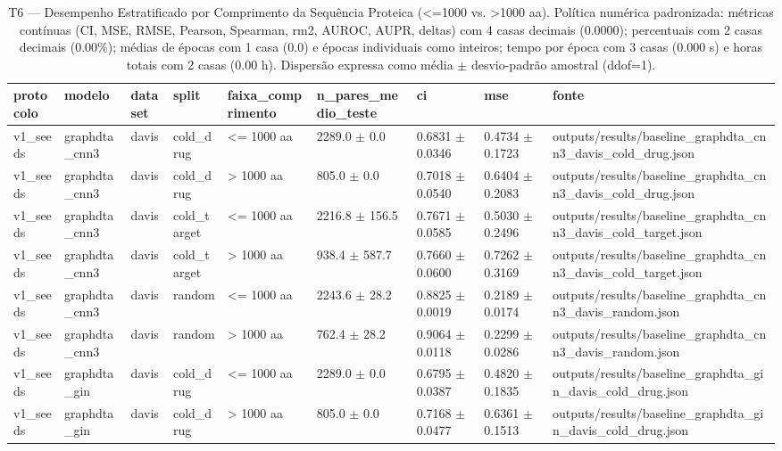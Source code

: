 \begin{table}[htbp]
\centering
\small
\caption{T6 — Desempenho Estratificado por Comprimento da Sequência Proteica (<=1000 vs. >1000 aa). Política numérica padronizada: métricas contínuas (CI, MSE, RMSE, Pearson, Spearman, rm2, AUROC, AUPR, deltas) com 4 casas decimais (0.0000); percentuais com 2 casas decimais (0.00\%); médias de épocas com 1 casa (0.0) e épocas individuais como inteiros; tempo por época com 3 casas (0.000 s) e horas totais com 2 casas (0.00 h). Dispersão expressa como média $\pm$ desvio-padrão amostral (ddof=1).}
\label{tab:t6_seq_length}
\begin{tabular}{lllllllll}
\toprule
\textbf{protocolo} & \textbf{modelo} & \textbf{dataset} & \textbf{split} & \textbf{faixa\_comprimento} & \textbf{n\_pares\_medio\_teste} & \textbf{ci} & \textbf{mse} & \textbf{fonte} \\
\midrule
v1\_seeds & graphdta\_cnn3 & davis & cold\_drug & <= 1000 aa & 2289.0 $\pm$ 0.0 & 0.6831 $\pm$ 0.0346 & 0.4734 $\pm$ 0.1723 & outputs/results/baseline\_graphdta\_cnn3\_davis\_cold\_drug.json \\
v1\_seeds & graphdta\_cnn3 & davis & cold\_drug & > 1000 aa & 805.0 $\pm$ 0.0 & 0.7018 $\pm$ 0.0540 & 0.6404 $\pm$ 0.2083 & outputs/results/baseline\_graphdta\_cnn3\_davis\_cold\_drug.json \\
v1\_seeds & graphdta\_cnn3 & davis & cold\_target & <= 1000 aa & 2216.8 $\pm$ 156.5 & 0.7671 $\pm$ 0.0585 & 0.5030 $\pm$ 0.2496 & outputs/results/baseline\_graphdta\_cnn3\_davis\_cold\_target.json \\
v1\_seeds & graphdta\_cnn3 & davis & cold\_target & > 1000 aa & 938.4 $\pm$ 587.7 & 0.7660 $\pm$ 0.0600 & 0.7262 $\pm$ 0.3169 & outputs/results/baseline\_graphdta\_cnn3\_davis\_cold\_target.json \\
v1\_seeds & graphdta\_cnn3 & davis & random & <= 1000 aa & 2243.6 $\pm$ 28.2 & 0.8825 $\pm$ 0.0019 & 0.2189 $\pm$ 0.0174 & outputs/results/baseline\_graphdta\_cnn3\_davis\_random.json \\
v1\_seeds & graphdta\_cnn3 & davis & random & > 1000 aa & 762.4 $\pm$ 28.2 & 0.9064 $\pm$ 0.0118 & 0.2299 $\pm$ 0.0286 & outputs/results/baseline\_graphdta\_cnn3\_davis\_random.json \\
v1\_seeds & graphdta\_gin & davis & cold\_drug & <= 1000 aa & 2289.0 $\pm$ 0.0 & 0.6795 $\pm$ 0.0387 & 0.4820 $\pm$ 0.1835 & outputs/results/baseline\_graphdta\_gin\_davis\_cold\_drug.json \\
v1\_seeds & graphdta\_gin & davis & cold\_drug & > 1000 aa & 805.0 $\pm$ 0.0 & 0.7168 $\pm$ 0.0477 & 0.6361 $\pm$ 0.1513 & outputs/results/baseline\_graphdta\_gin\_davis\_cold\_drug.json \\

\end{tabular}
\end{table}
